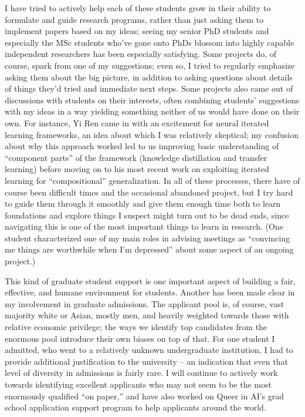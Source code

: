 \documentclass[12pt]{article}
\begin{document}

I have tried to actively help each of these students grow in their ability to formulate and guide research programs,
rather than just asking them to implement papers based on my ideas;
seeing my senior PhD students and especially the MSc students who've gone onto PhDs
blossom into highly capable independent researchers has been especially satisfying.
Some projects do, of course, spark from one of my suggestions;
even so, I tried to regularly emphasize asking them about the big picture,
in addition to asking questions about details of things they'd tried and immediate next steps.
Some projects also came out of discussions with students on their interests,
often combining students' suggestions with my ideas in a way yielding something neither of us would have done on their own.
For instance, Yi Ren came in with an excitement for neural iterated learning frameworks,
an idea about which I was relatively skeptical;
my confusion about why this approach worked
led to us improving basic understanding of ``component parts'' of the framework
(knowledge distillation and transfer learning)
before moving on to his most recent work on exploiting iterated learning for ``compositional'' generalization.
In all of these processes,
there have of course been difficult times and the occasional abandoned project,
but I try hard to guide them through it smoothly
and give them enough time both to learn foundations and explore things I suspect might turn out to be dead ends,
since navigating this is one of the most important things to learn in research.
(One student characterized one of my main roles in advising meetings as ``convincing me things are worthwhile when I'm depressed'' about some aspect of an ongoing project.)

This kind of graduate student support is one important aspect of building a fair, effective, and humane environment for students. Another has been made clear in my involvement in graduate admissions. The applicant pool is, of course, vast majority white or Asian, mostly men, and heavily weighted towards those with relative economic privilege; the ways we identify top candidates from the enormous pool introduce their own biases on top of that. For one student I admitted, who went to a relatively unknown undergraduate institution, I had to provide additional justification to the university -- an indication that even that level of diversity in admissions is fairly rare. I will continue to actively work towards identifying excellent applicants who may not seem to be the most enormously qualified ``on paper,''
and have also worked on Queer in AI's grad school application support program to help applicants around the world.
\end{document}
